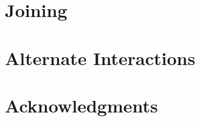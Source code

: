 \documentclass{sig-alternate}
\begin{document}
\section{Joining}
\label{sec:Joining}

\section{Alternate Interactions}
\label{sec:Alternate Interactions}

\section{Acknowledgments}
\label{sec:Acknowledgments}

%
%
\end{document}
